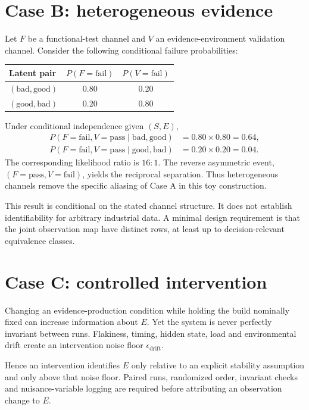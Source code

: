 \documentclass[11pt]{article}
\begin{document}
\section{Case B: heterogeneous evidence}
Let $F$ be a functional-test channel and $V$ an evidence-environment validation channel. Consider the following conditional failure probabilities:
\begin{center}
\begin{tabular}{lcc}
\toprule
Latent pair & $P(F=\mathrm{fail})$ & $P(V=\mathrm{fail})$\\
\midrule
$(\mathrm{bad},\mathrm{good})$ & 0.80 & 0.20\\
$(\mathrm{good},\mathrm{bad})$ & 0.20 & 0.80\\
\bottomrule
\end{tabular}
\end{center}
Under conditional independence given $(S,E)$,
\begin{align*}
P(F=\mathrm{fail},V=\mathrm{pass}\mid \mathrm{bad},\mathrm{good}) &= 0.80\times 0.80=0.64,\\
P(F=\mathrm{fail},V=\mathrm{pass}\mid \mathrm{good},\mathrm{bad}) &= 0.20\times 0.20=0.04.
\end{align*}
The corresponding likelihood ratio is $16{:}1$. The reverse asymmetric event, $(F=\mathrm{pass},V=\mathrm{fail})$, yields the reciprocal separation. Thus heterogeneous channels remove the specific aliasing of Case A in this toy construction.

This result is conditional on the stated channel structure. It does not establish identifiability for arbitrary industrial data. A minimal design requirement is that the joint observation map have distinct rows, at least up to decision-relevant equivalence classes.

\section{Case C: controlled intervention}
Changing an evidence-production condition while holding the build nominally fixed can increase information about $E$. Yet the system is never perfectly invariant between runs. Flakiness, timing, hidden state, load and environmental drift create an intervention noise floor $\epsilon_{\mathrm{drift}}$.

Hence an intervention identifies $E$ only relative to an explicit stability assumption and only above that noise floor. Paired runs, randomized order, invariant checks and nuisance-variable logging are required before attributing an observation change to $E$.
\end{document}
